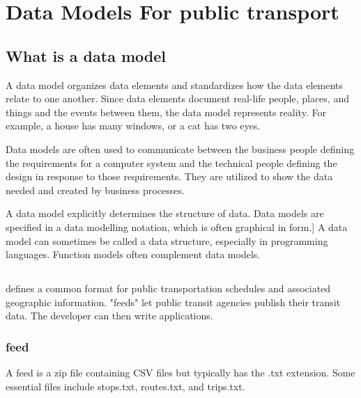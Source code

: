 \section{Data Models For public transport}\label{section:data_model_rel_work}

\subsection{What is a data model }
A data model organizes data elements and standardizes how the data elements relate to one another. Since data elements document real-life people, places, and things and the events between them, the data model represents reality. For example, a house has many windows, or a cat has two eyes.

Data models are often used to communicate between the business people defining the requirements for a computer system and the technical people defining the design in response to those requirements. They are utilized to show the data needed and created by business processes.
 
A data model explicitly determines the structure of data. Data models are specified in a data modelling notation, which is often graphical in form.]
A data model can sometimes be called a data structure, especially in programming languages. Function models often complement data models.
\subsection{}
 defines a common format for public transportation schedules and associated geographic information. "feeds" let public transit agencies publish their transit data. The developer can then write applications.
\subsubsection{ feed}
A feed is a zip file containing CSV files but typically has the .txt extension. Some essential files include stops.txt, routes.txt, and trips.txt.


